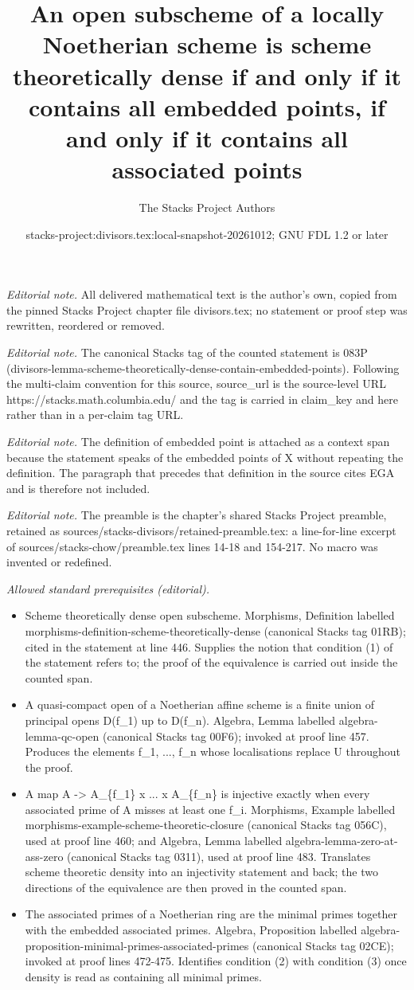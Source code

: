 \documentclass[10pt,a4paper]{amsart}
\title{An open subscheme of a locally Noetherian scheme is scheme theoretically dense if and only if it contains all embedded points, if and only if it contains all associated points}
\author{The Stacks Project Authors}
\date{stacks-project:divisors.tex:local-snapshot-20261012; GNU FDL 1.2 or later}
\theoremstyle{plain}
\theoremstyle{definition}
\theoremstyle{remark}
\numberwithin{equation}{subsection}
\begin{document}
\maketitle
\noindent\textit{Editorial note.} All delivered mathematical text is the author's own, copied from the pinned Stacks Project chapter file divisors.tex; no statement or proof step was rewritten, reordered or removed.\par\medskip
\noindent\textit{Editorial note.} The canonical Stacks tag of the counted statement is 083P (divisors-lemma-scheme-theoretically-dense-contain-embedded-points). Following the multi-claim convention for this source, source\_url is the source-level URL https://stacks.math.columbia.edu/ and the tag is carried in claim\_key and here rather than in a per-claim tag URL.\par\medskip
\noindent\textit{Editorial note.} The definition of embedded point is attached as a context span because the statement speaks of the embedded points of X without repeating the definition. The paragraph that precedes that definition in the source cites EGA and is therefore not included.\par\medskip
\noindent\textit{Editorial note.} The preamble is the chapter's shared Stacks Project preamble, retained as sources/stacks-divisors/retained-preamble.tex: a line-for-line excerpt of sources/stacks-chow/preamble.tex lines 14-18 and 154-217. No macro was invented or redefined.\par\medskip
\noindent\textit{Allowed standard prerequisites (editorial).}\begin{itemize}
\item Scheme theoretically dense open subscheme. Morphisms, Definition labelled morphisms-definition-scheme-theoretically-dense (canonical Stacks tag 01RB); cited in the statement at line 446. Supplies the notion that condition (1) of the statement refers to; the proof of the equivalence is carried out inside the counted span.
\item A quasi-compact open of a Noetherian affine scheme is a finite union of principal opens D(f\_1) up to D(f\_n). Algebra, Lemma labelled algebra-lemma-qc-open (canonical Stacks tag 00F6); invoked at proof line 457. Produces the elements f\_1, ..., f\_n whose localisations replace U throughout the proof.
\item A map A -> A\_\{f\_1\} x ... x A\_\{f\_n\} is injective exactly when every associated prime of A misses at least one f\_i. Morphisms, Example labelled morphisms-example-scheme-theoretic-closure (canonical Stacks tag 056C), used at proof line 460; and Algebra, Lemma labelled algebra-lemma-zero-at-ass-zero (canonical Stacks tag 0311), used at proof line 483. Translates scheme theoretic density into an injectivity statement and back; the two directions of the equivalence are then proved in the counted span.
\item The associated primes of a Noetherian ring are the minimal primes together with the embedded associated primes. Algebra, Proposition labelled algebra-proposition-minimal-primes-associated-primes (canonical Stacks tag 02CE); invoked at proof lines 472-475. Identifies condition (2) with condition (3) once density is read as containing all minimal primes.
\end{itemize}\medskip
\end{document}
